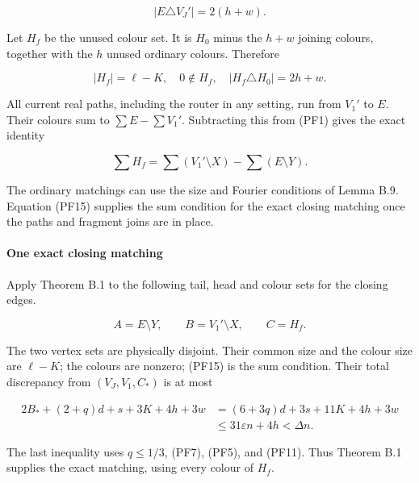 \documentclass[11pt,a4paper]{article}
\begin{document}
\begin{equation}
|E\triangle V_J'|=2(h+w).
\tag{PF13}\label{eq:PF13}
\end{equation}

Let \(H_f\) be the unused colour set. It is \(H_0\) minus the \(h+w\) joining colours, together with the \(h\) unused ordinary colours. Therefore

\begin{equation}
|H_f|=\ell-K,\quad 0\notin H_f,\quad
|H_f\triangle H_0|=2h+w.
\tag{PF14}\label{eq:PF14}
\end{equation}

All current real paths, including the router in any setting, run from \(V_1'\) to \(E\). Their colours sum to \(\sum E-\sum V_1'\). Subtracting this from (PF1) gives the exact identity

\begin{equation}
\sum H_f
=\sum(V_1'\setminus X)-\sum(E\setminus Y).
\tag{PF15}\label{eq:PF15}
\end{equation}

The ordinary matchings can use the size and Fourier conditions of Lemma B.9. Equation (PF15) supplies the sum condition for the exact closing matching once the paths and fragment joins are in place.

\hypertarget{one-exact-closing-matching}{%
\paragraph{One exact closing matching}\label{one-exact-closing-matching}}

Apply Theorem B.1 to the following tail, head and colour sets for the closing edges.

\[
A=E\setminus Y,\qquad B=V_1'\setminus X,\qquad C=H_f.
\]

The two vertex sets are physically disjoint. Their common size and the colour size are \(\ell-K\); the colours are nonzero; (PF15) is the sum condition. Their total discrepancy from \((V_J,V_1,C_*)\) is at most

\begin{equation}
\begin{aligned}
2B_*+(2+q)d+s+3K+4h+3w
&=(6+3q)d+3s+11K+4h+3w\\
&\le31\varepsilon n+4h<\Delta n.
\end{aligned}
\tag{PF16}\label{eq:PF16}
\end{equation}

The last inequality uses \(q\le1/3\), (PF7), (PF5), and (PF11). Thus Theorem B.1 supplies the exact matching, using every colour of \(H_f\).
\end{document}
